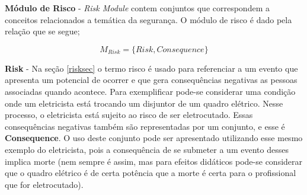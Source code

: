 \textbf{Módulo de Risco} - \textit{Risk Module} contem conjuntos que correspondem a conceitos relacionados a temática da segurança.
O módulo de risco é dado pela relação que se segue;

\begin{equation}
    M_{Risk} = \{ Risk, Consequence \}
\end{equation}

\textbf{Risk} - Na seção \ref{risksec} o termo risco é usado para referenciar a um evento que apresenta um potencial de ocorrer e que gera consequências negativas as pessoas associadas quando acontece. Para exemplificar pode-se considerar uma condição onde um eletricista está trocando um disjuntor de um quadro elétrico. Nesse processo, o eletricista está sujeito ao risco de ser eletrocutado. Essas consequências negativas também são representadas por um conjunto, e esse é \textbf{Consequence}. O uso deste conjunto pode ser apresentado utilizando esse mesmo exemplo do eletricista, pois a consequência de se submeter a um evento desses implica morte (nem sempre é assim, mas para efeitos didáticos pode-se considerar que o quadro elétrico é de certa potência que a morte é certa para o profissional que for eletrocutado).